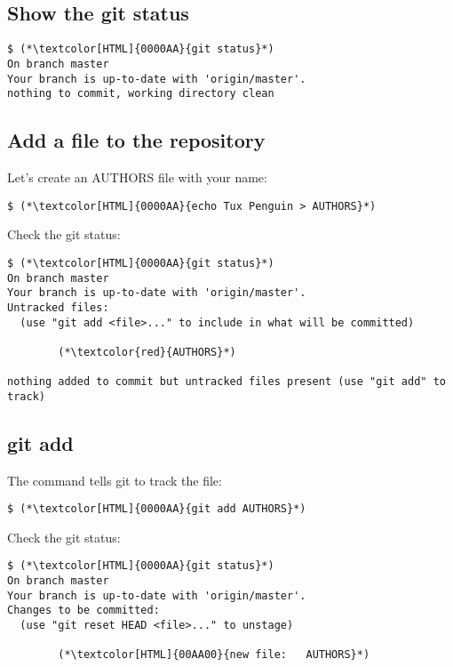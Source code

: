 \subsection{Show the git status}
\begin{frame}[fragile]
  \subslidetitle
  \begin{lstlisting}
$ (*\textcolor[HTML]{0000AA}{git status}*)
On branch master
Your branch is up-to-date with 'origin/master'.
nothing to commit, working directory clean
  \end{lstlisting}
\end{frame}


\subsection{Add a file to the repository}
\begin{frame}[fragile]
  \subslidetitle

  Let's create an AUTHORS file with your name:
  \begin{lstlisting}
$ (*\textcolor[HTML]{0000AA}{echo Tux Penguin > AUTHORS}*)
  \end{lstlisting}

  Check the git status:
  \begin{lstlisting}
$ (*\textcolor[HTML]{0000AA}{git status}*)
On branch master
Your branch is up-to-date with 'origin/master'.
Untracked files:
  (use "git add <file>..." to include in what will be committed)

        (*\textcolor{red}{AUTHORS}*)

nothing added to commit but untracked files present (use "git add" to track)
  \end{lstlisting}

\end{frame}

\subsection{git add}
\begin{frame}[fragile]
  \subslidetitle

  The command  tells git to track the file:
  \begin{lstlisting}
$ (*\textcolor[HTML]{0000AA}{git add AUTHORS}*)
  \end{lstlisting}

  Check the git status:
  \begin{lstlisting}
$ (*\textcolor[HTML]{0000AA}{git status}*)
On branch master
Your branch is up-to-date with 'origin/master'.
Changes to be committed:
  (use "git reset HEAD <file>..." to unstage)

        (*\textcolor[HTML]{00AA00}{new file:   AUTHORS}*)
  \end{lstlisting}

\end{frame}


